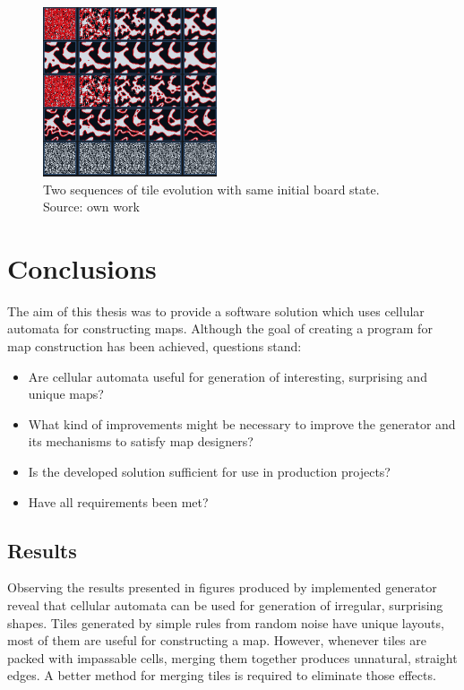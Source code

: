 \documentclass[12pt]{report}
\begin{document}
\begin{figure}[h]
	\centering
	\includegraphics[height=5cm]{images/ex2sequences}
	\caption{Two sequences of tile evolution with same initial board state. Source: own work}
	\label{fig:seqr2r3}
\end{figure}



\chapter{Conclusions} \label{rozdzial.podsumowanie}

The aim of this thesis was to provide a software solution which uses cellular automata for constructing maps. Although the goal of creating a program for map construction has been achieved, questions stand: 

\begin{itemize}
	\item Are cellular automata useful for generation of interesting, surprising and unique maps?
	\item What kind of improvements might be necessary to improve the generator and its mechanisms to satisfy map designers? 
	\item Is the developed solution sufficient for use in production projects?  
	\item Have all requirements been met?
\end{itemize}


\section{Results}

Observing the results presented in figures produced by implemented generator reveal that cellular automata can be used for generation of irregular, surprising shapes. Tiles generated by simple rules from random noise have unique layouts, most of them are useful for constructing a map. However, whenever tiles are packed with impassable cells, merging them together produces unnatural, straight edges. A better method for merging tiles is required to eliminate those effects.
\end{document}
